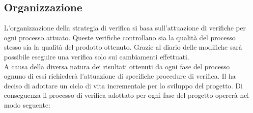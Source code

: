 	\subsection{Organizzazione}
		L'organizzazione della strategia di verifica si basa sull'attuazione di verifiche per ogni processo attuato. Queste verifiche controllano sia la qualità del processo stesso sia la qualità del prodotto ottenuto. Grazie al diario delle modifiche sarà possibile eseguire una verifica solo sui cambiamenti effettuati. \\
		A causa della diversa natura dei risultati ottenuti da ogni fase del processo ognuno di essi richiederà l'attuazione di specifiche procedure di verifica. Il  ha deciso di adottare un ciclo di vita incrementale per lo sviluppo del progetto. Di conseguenza il processo di verifica adottato per ogni fase del progetto opererà nel modo seguente:
